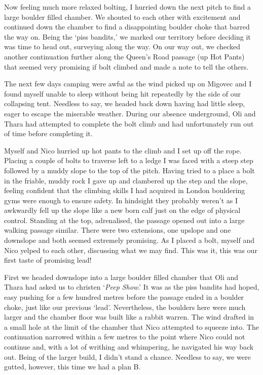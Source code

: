 Now feeling much more relaxed bolting, I hurried down the next pitch to
find a large boulder filled chamber. We shouted to each other with
excitement and continued down the chamber to find a disappointing
boulder choke that barred the way on. Being the `piss bandits,' we
marked our territory before deciding it was time to head out, surveying
along the way. On our way out, we checked another continuation further
along the Queen's Road passage (up Hot Pants) that seemed very promising
if bolt climbed and made a note to tell the others.

The next few days camping were awful as the wind picked up on Migovec
and I found myself unable to sleep without being hit repeatedly by the
side of our collapsing tent. Needless to say, we headed back down having
had little sleep, eager to escape the miserable weather. During our
absence underground, Oli and Thara had attempted to complete the bolt
climb and had unfortunately run out of time before completing it.

Myself and Nico hurried up hot pants to the climb and I set up off the
rope. Placing a couple of bolts to traverse left to a ledge I was faced
with a steep step followed by a muddy slope to the top of the pitch.
Having tried to a place a bolt in the friable, muddy rock I gave up and
clambered up the step and the slope, feeling confident that the climbing
skills I had acquired in London bouldering gyms were enough to ensure
safety. In hindsight they probably weren't as I awkwardly fell up the
slope like a new born calf just on the edge of physical control.
Standing at the top, adrenalised, the passage opened out into a large
walking passage similar. There were two extensions, one upslope and one
downslope and both seemed extremely promising. As I placed a bolt,
myself and Nico yelped to each other, discussing what we may find. This
was it, this was our first taste of promising lead!

First we headed downslope into a large boulder filled chamber that Oli
and Thara had asked us to christen `\emph{Peep Show}.' It was as the
piss bandits had hoped, easy pushing for a few hundred metres before the
passage ended in a boulder choke, just like our previous `lead'.
Nevertheless, the boulders here were much larger and the chamber floor
was built like a rabbit warren. The wind drafted in a small hole at the
limit of the chamber that Nico attempted to squeeze into. The
continuation narrowed within a few metres to the point where Nico could
not continue and, with a lot of writhing and whimpering, he navigated
his way back out. Being of the larger build, I didn't stand a chance.
Needless to say, we were gutted, however, this time we had a plan B.

